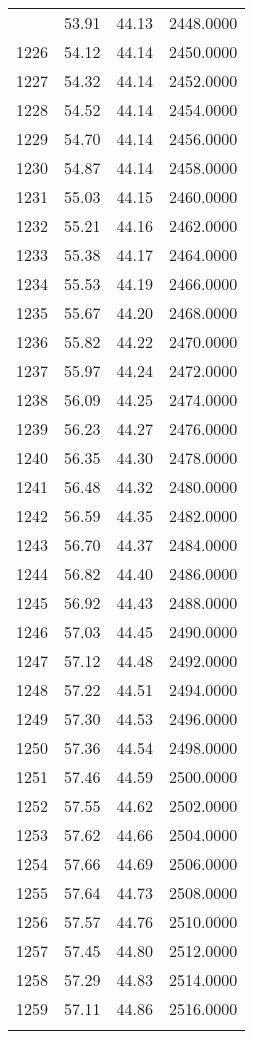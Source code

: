 \documentclass[
  captions=tableheading,
]{scrartcl}
\begin{document}
\begin{longtable} {l|l|l|l}
{1225 &	53.91 &	44.13 &	2448.0000\\
1226 &	54.12 &	44.14 &	2450.0000\\
1227 &	54.32 &	44.14 &	2452.0000\\
1228 &	54.52 &	44.14 &	2454.0000\\
1229 &	54.70 &	44.14 &	2456.0000\\
1230 &	54.87 &	44.14 &	2458.0000\\
1231 &	55.03 &	44.15 &	2460.0000\\
1232 &	55.21 &	44.16 &	2462.0000\\
1233	& 55.38 &	44.17 &	2464.0000 \\
1234	& 55.53 &	44.19 &	2466.0000 \\
1235	& 55.67 &	44.20 &	2468.0000 \\
1236	& 55.82 &	44.22 &	2470.0000 \\
1237	& 55.97 &	44.24 &	2472.0000 \\
1238	& 56.09 &	44.25 &	2474.0000 \\
1239	& 56.23 &	44.27 &	2476.0000 \\
1240	& 56.35 &	44.30 &	2478.0000 \\
1241	& 56.48 &	44.32 &	2480.0000 \\
1242	& 56.59 &	44.35 &	2482.0000 \\
1243	& 56.70 &	44.37 &	2484.0000 \\
1244	& 56.82 &	44.40 &	2486.0000 \\
1245	& 56.92 &	44.43 &	2488.0000 \\
1246	& 57.03 &	44.45 &	2490.0000 \\
1247	& 57.12 &	44.48 &	2492.0000 \\
1248	& 57.22 &	44.51 &	2494.0000 \\
1249	& 57.30 &	44.53 &	2496.0000 \\
1250	& 57.36 &	44.54 &	2498.0000 \\
1251	& 57.46 &	44.59 &	2500.0000 \\
1252	& 57.55 &	44.62 &	2502.0000 \\
1253	& 57.62 &	44.66 &	2504.0000 \\
1254	& 57.66 &	44.69 &	2506.0000 \\
1255	& 57.64 &	44.73 &	2508.0000 \\
1256	& 57.57 &	44.76 &	2510.0000 \\
1257	& 57.45 &	44.80 &	2512.0000 \\
1258	& 57.29 &	44.83 &	2514.0000 \\
1259	& 57.11 &	44.86 &	2516.0000 \\
}
\end{longtable}
\end{document}
